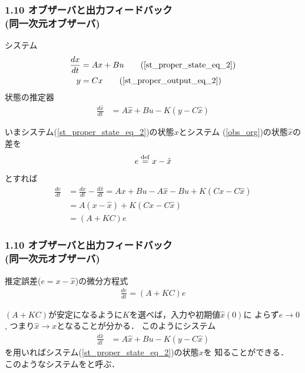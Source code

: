 \begin{frame}[t]
\frametitle{1.10 オブザーバと出力フィードバック \\
(同一次元オブザーバ)}
システム
\begin{align}
 \frac{dx}{dt} &= A x + B u \tag{\ref{st_proper_state_eq_2}} \\
 y             &= C x \tag{\ref{st_proper_output_eq_2}}
\end{align}
状態の推定器
\begin{align}
 \frac{d \hat{x}}{dt} &= A \hat{x} + B u - K (y - C \hat{x})
 \tag{1.204} \label{obs_org}
\end{align}
\addtocounter{equation}{4}
いまシステム(\ref{st_proper_state_eq_2})の状態$x$とシステム
(\ref{obs_org})の状態$\hat{x} $の差を
\begin{equation}
 e \stackrel{\rm def}{=} x - \hat{x}
\end{equation}
とすれば
\begin{align}
\frac{de}{dt} &= \frac{dx}{dt} - \frac{d \hat{x}}{dt} 
  = A x + B u - A \hat{x} - B u + K ( C x - C \hat{x}) \nonumber \\
 &= A (x - \hat{x}) + K ( C x - C \hat{x}) \nonumber \\
 &= (A + KC) e
\end{align}
\end{frame}


\begin{frame}[t]
\frametitle{1.10 オブザーバと出力フィードバック \\
(同一次元オブザーバ)}

推定誤差($e = x - \hat{x}$)の微分方程式
\begin{align}
\frac{de}{dt} = (A + KC) e \tag{1.206}
\end{align}



$(A+KC)$が安定になるように$K$を選べば，入力や初期値$\hat{x}(0)$に
よらず$e \rightarrow 0$, つまり$\hat{x} \rightarrow x$となることが分かる．
このようにシステム
\begin{align}
 \frac{d \hat{x}}{dt} &= A \hat{x} + B u - K (y - C \hat{x})
 \tag{1.204} \label{obs_org}
\end{align}
を用いればシステム(\ref{st_proper_state_eq_2})の状態$x$を
知ることができる．\\
このようなシステムをと呼ぶ．\\
\end{frame}


